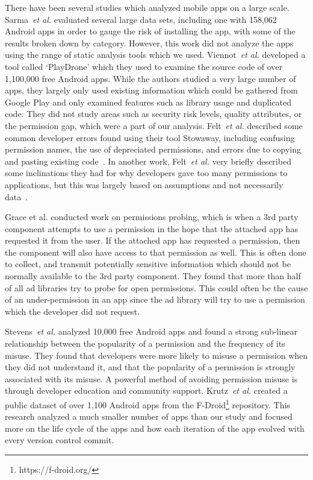 \documentclass{llncs}
\begin{document}
There have been several studies which analyzed mobile apps on a large scale. Sarma~\emph{et al.} evaluated several large data sets, including one with 158,062 Android apps in order to gauge the risk of installing the app, with some of the results broken down by category. However, this work did not analyze the apps using the range of static analysis tools which we used. Viennot~\emph{et al.} developed a tool called `PlayDrone' which they used to examine the source code of over 1,100,000 free Android apps. While the authors studied a very large number of apps, they largely only used existing information which could be gathered from Google Play and only examined features such as library usage and duplicated code. They did not study areas such as security risk levels, quality attributes, or the permission gap, which were a part of our analysis. Felt~\emph{et al.} described some common developer errors found using their tool Stowaway, including confusing permission names, the use of depreciated permissions, and errors due to copying and pasting existing code~\cite{Felt:2011:APD:2046707.2046779}. In another work, Felt~\emph{et al.} very briefly described some inclinations they had for why developers gave too many permissions to applications, but this was largely based on assumptions and not necessarily data~\cite{Felt:2011:EAP:2002168.2002175}.



Grace et al.\cite{Grace:2012:UEA:2185448.2185464} conducted work on permissions probing, which is when a 3rd party component attempts to use a permission in the hope that the attached app has requested it from the user. If the attached app has requested a permission, then the component will also have access to that permission as well. This is often done to collect, and transmit potentially sensitive information which should not be normally available to the 3rd party component. They found that more than half of all ad libraries try to probe for open permissions. This could often be the cause of an under-permission in an app since the ad library will try to use a permission which the developer did not request.

Stevens~\emph{et al.}\cite{6624000} analyzed 10,000 free Android apps and found a strong sub-linear relationship between the popularity of a permission and the frequency of its misuse. They found that developers were more likely to misuse a permission when they did not understand it, and that the popularity of a permission is strongly associated with its misuse. A powerful method of avoiding permission misuse is through developer education and community support. Krutz~\emph{et al.}\cite{krutz2015FDroid} created a public dataset of over 1,100 Android apps from the F-Droid\footnote{https://f-droid.org/} repository. This research analyzed a much smaller number of apps than our study and focused more on the life cycle of the apps and how each iteration of the app evolved with every version control commit.
\end{document}
